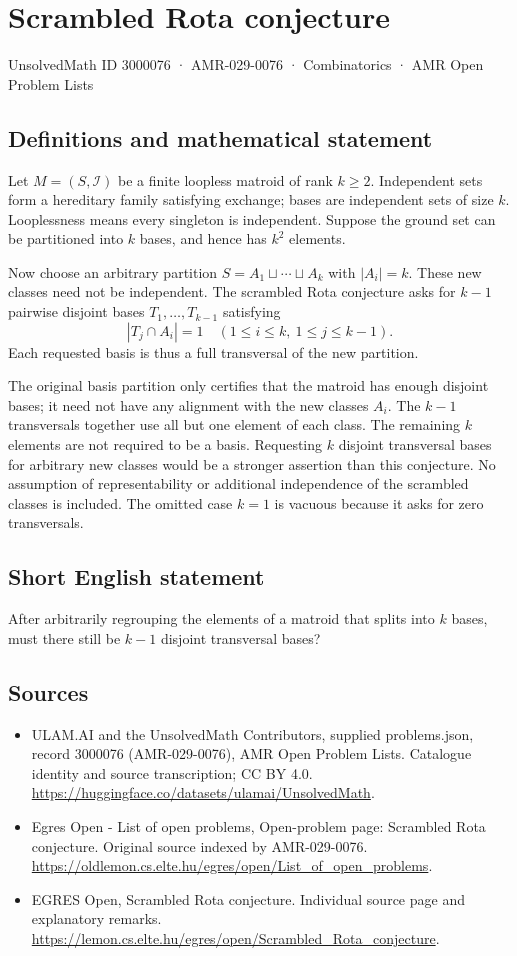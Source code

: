\documentclass[11pt,a4paper]{article}
\begin{document}
\section*{Scrambled Rota conjecture}\label{3000076}
{\small UnsolvedMath ID 3000076 · AMR-029-0076 · Combinatorics · AMR Open Problem Lists}
\subsection{Definitions and mathematical statement}
Let $M=(S,\mathcal I)$ be a finite loopless matroid of rank $k\ge2$.
Independent sets form a hereditary family satisfying exchange;
bases are independent sets of size $k$. Looplessness means every
singleton is independent. Suppose the ground set can be partitioned
into $k$ bases, and hence has $k^2$ elements.

Now choose an arbitrary partition $S=A_1\sqcup\cdots\sqcup A_k$
with $|A_i|=k$. These new classes need not be independent.
The scrambled Rota conjecture asks for $k-1$ pairwise disjoint
bases $T_1,\ldots,T_{k-1}$ satisfying
\[
                              |T_j\cap A_i|=1
                                \quad(1\le i\le k,\ 1\le j\le k-1).
\]
Each requested basis is thus a full transversal of the new partition.

The original basis partition only certifies that the matroid has
enough disjoint bases; it need not have any alignment with the
new classes $A_i$. The $k-1$ transversals together use all but one
element of each class. The remaining $k$ elements are not required
to be a basis. Requesting $k$ disjoint transversal bases for arbitrary
new classes would be a stronger assertion than this conjecture.
No assumption of representability or additional independence of
the scrambled classes is included. The omitted case $k=1$ is
vacuous because it asks for zero transversals.
\subsection{Short English statement}
After arbitrarily regrouping the elements of a matroid that
splits into $k$ bases, must there still be $k-1$ disjoint transversal bases?
\subsection{Sources}
\begin{itemize}
\item[S1] ULAM.AI and the UnsolvedMath Contributors, supplied problems.json, record 3000076 (AMR-029-0076), AMR Open Problem Lists. Catalogue identity and source transcription; CC BY 4.0.
\url{https://huggingface.co/datasets/ulamai/UnsolvedMath}.
\item[S2] Egres Open - List of open problems, Open-problem page: Scrambled Rota conjecture. Original source indexed by AMR-029-0076.
\url{https://oldlemon.cs.elte.hu/egres/open/List_of_open_problems}.
\item[S3] EGRES Open, Scrambled Rota conjecture. Individual source page and explanatory remarks.
\url{https://lemon.cs.elte.hu/egres/open/Scrambled_Rota_conjecture}.
\end{itemize}
\end{document}
